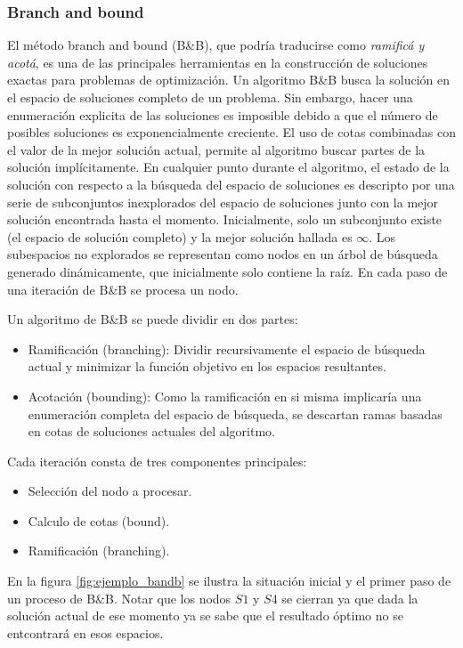 \documentclass[10pt, a4paper]{article}
\theoremstyle{definition}
\begin{document}
\subsubsection{Branch and bound}
El método branch and bound (B\&B), que podría traducirse como \textit{ramificá y acotá}, es una de las principales herramientas en la construcción de soluciones exactas para problemas de optimización.
Un algoritmo B\&B busca la solución en el espacio de soluciones completo de un problema.
Sin embargo, hacer una enumeración explicita de las soluciones es imposible debido a que el número de posibles soluciones es exponencialmente creciente.
El uso de cotas combinadas con el valor de la mejor solución actual, permite al algoritmo buscar partes de la solución implícitamente.
En cualquier punto durante el algoritmo, el estado de la solución con respecto a la búsqueda del espacio de soluciones es descripto por una serie de subconjuntos inexplorados del espacio de soluciones junto con la mejor solución encontrada hasta el momento.
Inicialmente, solo un subconjunto existe (el espacio de solución completo) y la mejor solución hallada es $\infty$. 
Los subespacios no explorados se representan como nodos en un árbol de búsqueda generado dinámicamente, que inicialmente solo contiene la raíz. 
En cada paso de una iteración de B\&B se procesa un nodo.

Un algoritmo de B\&B se puede dividir en dos partes:

\begin{itemize}
  \item Ramificación (branching): Dividir recursivamente el espacio de búsqueda actual y minimizar la función objetivo en los espacios resultantes.
  \item Acotación (bounding): Como la ramificación en si misma implicaría una enumeración completa del espacio de búsqueda, se descartan ramas basadas en cotas de soluciones actuales del algoritmo.
\end{itemize}

Cada iteración consta de tres componentes principales:
 
\begin{itemize}
  \item Selección del nodo a procesar.
  \item Calculo de cotas (bound).
  \item Ramificación (branching).
\end{itemize}

En la figura \ref{fig:ejemplo_bandb} se ilustra la situación inicial y el primer paso de un proceso de B\&B. Notar que los nodos $S1$ y $S4$ se cierran ya que dada la solución actual de ese momento ya se sabe que el resultado óptimo no se entcontrará en esos espacios.
\end{document}
